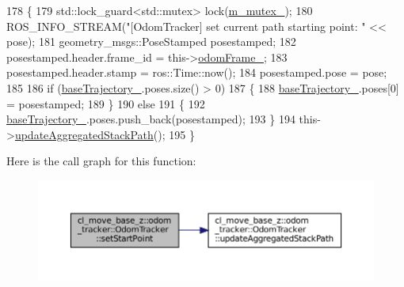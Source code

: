 \begin{DoxyCode}
178 \{
179     std::lock\_guard<std::mutex> lock(\hyperlink{classcl__move__base__z_1_1odom__tracker_1_1OdomTracker_aa371639e1eee269273dec8d3ab9dba0f}{m\_mutex\_});
180     ROS\_INFO\_STREAM(\textcolor{stringliteral}{"[OdomTracker] set current path starting point: "} << pose);
181     geometry\_msgs::PoseStamped posestamped;
182     posestamped.header.frame\_id = this->\hyperlink{classcl__move__base__z_1_1odom__tracker_1_1OdomTracker_a54f31af5e74006560d94f266297853d4}{odomFrame\_};
183     posestamped.header.stamp = ros::Time::now();
184     posestamped.pose = pose;
185 
186     \textcolor{keywordflow}{if} (\hyperlink{classcl__move__base__z_1_1odom__tracker_1_1OdomTracker_a466d18a86df049f0f680e043bb5ea91f}{baseTrajectory\_}.poses.size() > 0)
187     \{
188         \hyperlink{classcl__move__base__z_1_1odom__tracker_1_1OdomTracker_a466d18a86df049f0f680e043bb5ea91f}{baseTrajectory\_}.poses[0] = posestamped;
189     \}
190     \textcolor{keywordflow}{else}
191     \{
192         \hyperlink{classcl__move__base__z_1_1odom__tracker_1_1OdomTracker_a466d18a86df049f0f680e043bb5ea91f}{baseTrajectory\_}.poses.push\_back(posestamped);
193     \}
194     this->\hyperlink{classcl__move__base__z_1_1odom__tracker_1_1OdomTracker_a7922f1e1e688a2ed62d32d9914985a9f}{updateAggregatedStackPath}();
195 \}
\end{DoxyCode}
Here is the call graph for this function\+:
\nopagebreak
\begin{figure}[H]
\begin{center}
\leavevmode
\includegraphics[width=350pt]{classcl__move__base__z_1_1odom__tracker_1_1OdomTracker_a4aefe72c155bd0d57c9f42b77a8928a6_cgraph}
\end{center}
\end{figure}
\mbox{\label{classcl__move__base__z_1_1odom__tracker_1_1OdomTracker_aeed01bdefd9a1cc709b0b3e4eed285ed}} 
